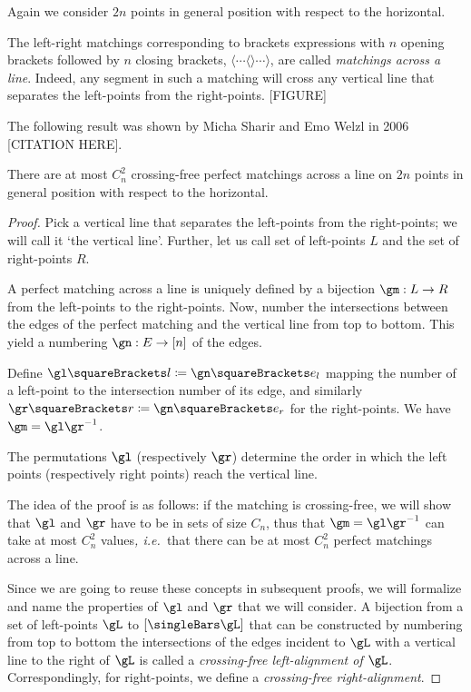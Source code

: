 \documentclass[10pt, a4paper, twoside]{basestyle}
\newcommand{\idest}{\emph{, i.e.\ }}
\begin{document}
Again we consider $2n$ points in general position with respect to the horizontal.

The left-right matchings corresponding to brackets expressions with $n$ opening brackets followed
by $n$ closing brackets, $\langle \dotsb \langle \rangle \dotsb \rangle$, are called \emph{matchings
across a line}. Indeed, any segment in such a matching will cross any vertical line that separates
the left-points from the right-points. [FIGURE]

The following result was shown by Micha Sharir and Emo Welzl in 2006 [CITATION HERE].
\begin{theorem}
There are at most $C_n^2$ crossing-free perfect matchings across a line on $2n$ points in general position with
respect to the horizontal.
\begin{proof}
Pick a vertical line that separates the left-points from the right-points; we will call it `the vertical line'.
Further, let us call set of left-points $L$ and the set of right-points $R$.

A perfect matching across a line is uniquely defined by a bijection $\FunctionSpec \gm L R$ from
the left-points to the right-points.
Now, number the intersections between the edges of the perfect matching and the vertical
line from top to bottom. This yield a numbering $\FunctionSpec \gn E {[n]}$ of the edges.

Define $\gl\of l \DefineAs \gn\of{e_l}$ mapping the number of a left-point to the intersection number of its
edge, and similarly $\gr\of r \DefineAs \gn\of{e_r}$ for the right-points. We have $\gm = \gl \gr^{-1}$.

The permutations $\gl$ (respectively $\gr$) determine the order in which the left points (respectively right points)
reach the vertical line.

The idea of the proof is as follows: if the matching is crossing-free, we will show that
$\gl$ and $\gr$ have to be in sets of size $C_n$, thus that $\gm = \gl \gr^{-1}$ can take at most
$C_n^2$ values\idest that there can be at most $C_n^2$ perfect matchings across a line.

Since we are going to reuse these concepts in subsequent proofs, we will formalize and name the properties of
$\gl$ and $\gr$ that we will consider. A bijection from a set of left-points $\gL$ to $[\Cardinality \gL]$
that can be constructed by numbering from top to bottom the intersections of the edges incident to $\gL$ with a
vertical line to the right of $\gL$ is called a \emph{crossing-free left-alignment of $\gL$}. Correspondingly, for
right-points, we define a \emph{crossing-free right-alignment}.


\end{proof}
\end{theorem}
\end{document}
